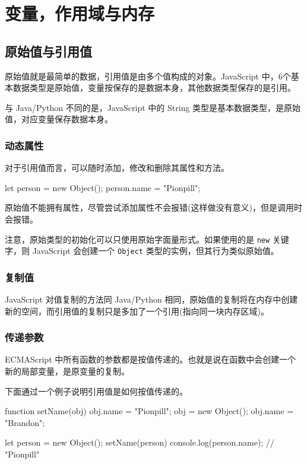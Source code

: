 \section{变量，作用域与内存}
\subsection{原始值与引用值}

原始值就是最简单的数据，引用值是由多个值构成的对象。JavaScript 中，6个基本数据类型是原始值，变量按保存的是数据本身，其他数据类型保存的是引用。

与 Java/Python 不同的是，JavaScript 中的 String 类型是基本数据类型，是原始值，对应变量保存数据本身。

\subsubsection{动态属性}

对于引用值而言，可以随时添加，修改和删除其属性和方法。

\begin{JavaScript}
let person = new Object();
person.name = "Pionpill";
\end{JavaScript}

原始值不能拥有属性，尽管尝试添加属性不会报错(这样做没有意义)，但是调用时会报错。

注意，原始类型的初始化可以只使用原始字面量形式。如果使用的是 \texttt{new} 关键字，则 JavaScript 会创建一个 \texttt{Object} 类型的实例，但其行为类似原始值。

\subsubsection{复制值}

JavaScript 对值复制的方法同 Java/Python 相同，原始值的复制将在内存中创建新的空间，而引用值的复制只是多加了一个引用(指向同一块内存区域)。

\subsubsection{传递参数}

ECMAScript 中所有函数的参数都是按值传递的。也就是说在函数中会创建一个新的局部变量，是原变量的复制。

下面通过一个例子说明引用值是如何按值传递的。

\begin{JavaScript}
function setName(obj) {
    obj.name = "Pionpill";
    obj = new Object();
    obj.name = "Brandon";
}

let person = new Object();
setName(person)
console.log(person.name);   // "Pionpill"
\end{JavaScript}

